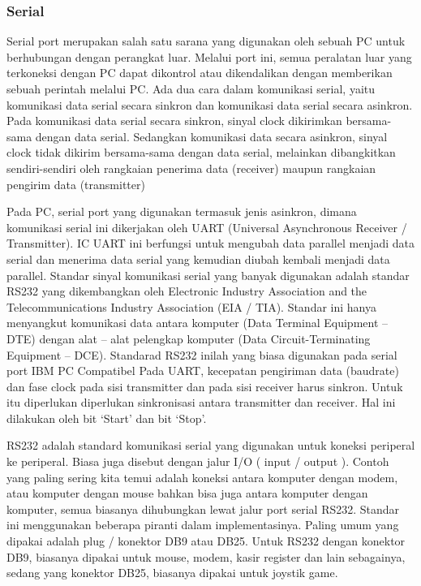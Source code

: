 \begin{itemize}
\subsubsection{Serial}
Serial port merupakan salah satu sarana yang digunakan oleh sebuah PC untuk berhubungan dengan perangkat luar. Melalui port ini, semua peralatan luar yang terkoneksi dengan PC dapat dikontrol atau dikendalikan dengan memberikan sebuah perintah melalui PC. Ada dua cara dalam komunikasi serial, yaitu komunikasi data serial secara sinkron dan komunikasi data serial secara asinkron. Pada komunikasi data serial secara sinkron, sinyal clock dikirimkan bersama-sama dengan data serial. Sedangkan komunikasi data secara asinkron, sinyal clock tidak dikirim bersama-sama dengan data serial, melainkan
dibangkitkan sendiri-sendiri oleh rangkaian penerima data (receiver) maupun rangkaian pengirim data (transmitter)

Pada PC, serial port yang digunakan termasuk jenis asinkron, dimana komunikasi serial ini dikerjakan oleh UART (Universal Asynchronous Receiver / Transmitter). IC UART ini berfungsi untuk mengubah data parallel menjadi data serial dan menerima data serial yang kemudian diubah kembali menjadi data parallel.
Standar sinyal komunikasi serial yang banyak digunakan adalah standar RS232 yang dikembangkan oleh Electronic Industry Association and the Telecommunications Industry Association (EIA / TIA). Standar ini hanya menyangkut komunikasi data antara komputer (Data Terminal Equipment – DTE) dengan alat – alat pelengkap komputer (Data Circuit-Terminating Equipment – DCE). Standarad RS232 inilah yang biasa digunakan pada serial port IBM PC Compatibel
Pada UART, kecepatan pengiriman data (baudrate) dan fase clock pada sisi transmitter dan pada sisi receiver harus sinkron. Untuk itu diperlukan diperlukan sinkronisasi antara transmitter dan receiver. Hal ini dilakukan oleh bit ‘Start’ dan bit ‘Stop’.

RS232 adalah standard komunikasi serial yang digunakan untuk koneksi periperal ke periperal. Biasa juga disebut dengan jalur I/O ( input / output ). Contoh yang paling sering kita temui adalah koneksi antara komputer dengan modem, atau komputer dengan mouse bahkan bisa juga antara komputer dengan komputer, semua biasanya dihubungkan lewat jalur port serial RS232. 
Standar ini menggunakan beberapa piranti dalam implementasinya. Paling umum yang dipakai adalah plug / konektor DB9 atau DB25. Untuk RS232 dengan konektor DB9, biasanya dipakai untuk mouse, modem, kasir register dan lain sebagainya, sedang yang konektor DB25, biasanya dipakai untuk joystik game.


\end{itemize}
